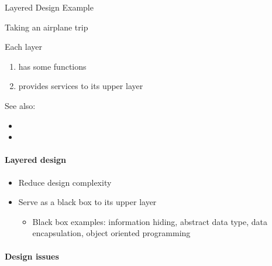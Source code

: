 \begin{frame}{Layered Design Example}
  \begin{minipage}{.5\linewidth}
    \begin{iblock}{Taking an airplane trip}
      \mode<beamer>{ \texttt{[image: airtrip]} }%
    \end{iblock}
  \end{minipage}\qquad
  \begin{minipage}{.4\linewidth}
    Each layer
    \begin{enumerate}
    \item has some functions
    \item provides services to its upper layer
    \end{enumerate}
  \end{minipage}
\end{frame}

See also:
\begin{itemize}
\item {}
\item {}
\end{itemize}

\paragraph{Layered design}

\begin{itemize}
\item Reduce design complexity
\item Serve as a black box to its upper layer
  \begin{itemize}
  \item Black box examples: information hiding, abstract data type, data encapsulation,
    object oriented programming
  \end{itemize}
\end{itemize}
  
\paragraph{Design issues}

